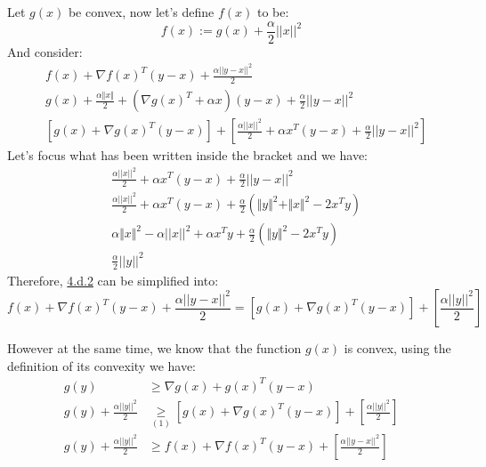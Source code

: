 \documentclass[]{article}
\begin{document}
    Let $g(x)$ be convex, now let's define $f(x)$ to be: 
    $$
    f(x) := g(x) + \frac{\alpha}{2}||x||^2
    $$
    And consider: 
    \begin{align*}\tag{4.d.2}\label{eqn:4.d.2}
        & f(x) + \nabla f(x)^T(y - x) + \frac{\alpha||y - x||^2}{2} \\ 
        & g(x)+\frac{\alpha\Vert x\Vert}{2} + (\nabla g(x)^T + \alpha x)(y - x) + \frac{\alpha}{2}||y - x||^2\\
        & \left[g(x) + \nabla g(x)^T(y - x)\right] + 
            \left[\frac{\alpha||x||^2}{2}
            +\alpha x^T(y - x) + \frac{\alpha}{2}||y - x||^2
            \right]
    \end{align*}
    Let's focus what has been written inside the bracket and we have: 
    \begin{align*}\tag{4.d.3}\label{eqn:4.d.3}
        &
        \frac{\alpha||x||^2}{2}
        +\alpha x^T(y - x) + \frac{\alpha}{2}||y - x||^2
        \\&
        \frac{\alpha||x||^2}{2}
        +\alpha x^T(y - x) + \frac{\alpha}{2}
        \left(
            \Vert y\Vert^2 + \Vert x \Vert^2 - 2x^Ty
        \right)
        \\&
        \alpha\Vert x\Vert^2 - \alpha ||x||^2+\alpha x^Ty
        +
        \frac{\alpha}{2}
        \left(
            \Vert y\Vert^2 - 2x^Ty
        \right)
        \\&
        \frac{\alpha}{2}||y||^2
    \end{align*}
    Therefore, \hyperref[eqn:4.d.2]{4.d.2} can be simplified into: 
    \begin{equation*}\tag{4.d.4}\label{eqn:4.d.4}
        f(x) + \nabla f(x)^T(y - x) + \frac{\alpha||y - x||^2}{2}
        =
        \left[g(x) + \nabla g(x)^T(y - x)\right] + 
        \left\lbrack\frac{\alpha||y||^2}{2}
        \right\rbrack
    \end{equation*}
    \par
    However at the same time, we know that the function $g(x)$ is convex, using the definition of its convexity we have: 
    \begin{align*}\tag{4.d.5}\label{eqn:4.d.5}
        g(y) &\ge \nabla g(x) + g(x)^T(y - x) \\
        g(y)+\frac{\alpha||y||^2}{2} &\underset{(1)}{\ge}
        \left\lbrack g(x) + \nabla g(x)^T(y - x)\right\rbrack + 
        \left\lbrack\frac{\alpha||y||^2}{2}
        \right\rbrack
        \\
        g(y)+\frac{\alpha||y||^2}{2} &\ge f(x) + \nabla f(x)^T(y - x) + \left\lbrack\frac{\alpha||y - x||^2}{2}\right\rbrack
    \end{align*}
\end{document}
